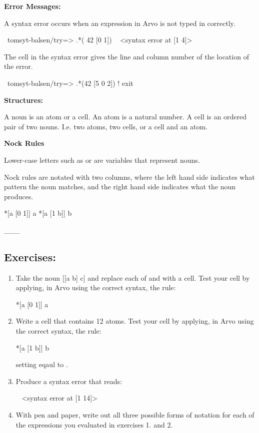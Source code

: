 \textbf{Error Messages:}

A syntax error occurs when an expression in Arvo is not typed in correctly.

\begin{code}
~tomsyt-balsen/try=> .*( 42 [0 1]) 
~ <syntax error at [1 4]>
\end{code}

The cell in the syntax error gives the line and column number of the location of the error.

\begin{code}
~tomsyt-balsen/try=> .*(42 [5 0 2]) 
! exit
\end{code}

\textbf{Structures:}

A noun is an atom or a cell.  An atom is a natural number.  A cell is an
ordered pair of two nouns. I.e. two atoms, two cells, or a cell and an atom.

\textbf{Nock Rules}

Lower-case letters such as  or  are variables that represent nouns. 

Nock rules are notated with two columns, where the left hand side indicates
what pattern the noun matches, and the right hand side indicates what the noun
produces.
\begin{code}
*[a [0 1]]                  a
*[a [1 b]]                  b
\end{code}
\_\_\_

\subsection{Exercises:}

\begin{enumerate}
\item Take the noun [[a b] c] and replace each of   and  with a cell. Test your cell by applying, in Arvo using the correct syntax, the rule:
\begin{code}
*[a [0 1]]                  a
\end{code}
\item Write a cell that contains 12 atoms. Test your cell by applying, in Arvo using the correct syntax, the rule:
\begin{code}
*[a [1 b]]                  b
\end{code}
setting  eqaul to .
\item Produce a syntax error that reads:
\begin{code}
~ <syntax error at [1 14]>
\end{code}
\item With pen and paper, write out all three possible forms of notation for each
of the expressions you evaluated in exercises 1. and 2.
\end{enumerate}

